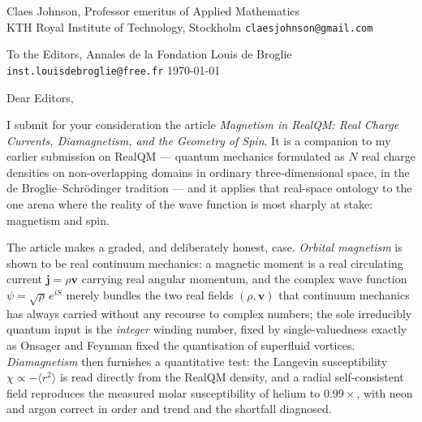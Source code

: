 \documentclass[11pt]{article}
\begin{document}
\noindent
Claes Johnson, Professor emeritus of Applied Mathematics \\
KTH Royal Institute of Technology, Stockholm \quad\textbar\quad \texttt{claesjohnson@gmail.com}

\vspace{1em}

\noindent
To the Editors, Annales de la Fondation Louis de Broglie \quad\textbar\quad \texttt{inst.louisdebroglie@free.fr} \hfill \today

\vspace{1em}

\noindent Dear Editors,

\medskip

I submit for your consideration the article \emph{Magnetism in RealQM: Real
Charge Currents, Diamagnetism, and the Geometry of Spin}. It is a companion to
my earlier submission on RealQM --- quantum mechanics formulated as $N$ real
charge densities on non-overlapping domains in ordinary three-dimensional
space, in the de Broglie--Schr\"odinger tradition --- and it applies that
real-space ontology to the one arena where the reality of the wave function is
most sharply at stake: magnetism and spin.

The article makes a graded, and deliberately honest, case. \emph{Orbital
magnetism} is shown to be real continuum mechanics: a magnetic moment is a real
circulating current $\mathbf{j}=\rho\mathbf{v}$ carrying real angular momentum,
and the complex wave function $\psi=\sqrt{\rho}\,e^{iS}$ merely bundles the two
real fields $(\rho,\mathbf{v})$ that continuum mechanics has always carried
without any recourse to complex numbers; the sole irreducibly quantum input is
the \emph{integer} winding number, fixed by single-valuedness exactly as
Onsager and Feynman fixed the quantisation of superfluid vortices. \emph{
Diamagnetism} then furnishes a quantitative test: the Langevin susceptibility
$\chi\propto-\langle r^2\rangle$ is read directly from the RealQM density, and a
radial self-consistent field reproduces the measured molar susceptibility of
helium to $0.99\times$, with neon and argon correct in order and trend and the
shortfall diagnosed.
\end{document}
